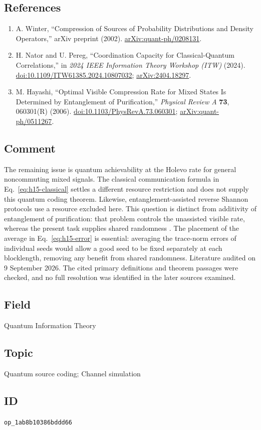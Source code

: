 \subsection*{References}

\begin{enumerate}[label={},leftmargin=4.8em,labelsep=0.5em]
  \footnotesize
  \item[\textup{[Win02]}]\label{ref:h15-winter}
  A. Winter, ``Compression of Sources of Probability Distributions and Density Operators,'' arXiv preprint (2002). \href{https://arxiv.org/abs/quant-ph/0208131}{arXiv:quant-ph/0208131}.

  \item[\textup{[NP24]}]\label{ref:h15-nator}
  H. Nator and U. Pereg, ``Coordination Capacity for Classical-Quantum Correlations,'' in \emph{2024 IEEE Information Theory Workshop (ITW)} (2024). \href{https://doi.org/10.1109/ITW61385.2024.10807032}{doi:10.1109/ITW61385.2024.10807032}; \href{https://arxiv.org/abs/2404.18297}{arXiv:2404.18297}.

  \item[\textup{[Hay06]}]\label{ref:h15-hayashi}
  M. Hayashi, ``Optimal Visible Compression Rate for Mixed States Is Determined by Entanglement of Purification,'' \emph{Physical Review A} \textbf{73}, 060301(R) (2006). \href{https://doi.org/10.1103/PhysRevA.73.060301}{doi:10.1103/PhysRevA.73.060301}; \href{https://arxiv.org/abs/quant-ph/0511267}{arXiv:quant-ph/0511267}.
\end{enumerate}

\subsection*{Comment}

The remaining issue is quantum achievability at the Holevo rate for general noncommuting mixed signals. The classical communication formula in Eq.~\eqref{eq:h15-classical} settles a different resource restriction and does not supply this quantum coding theorem. Likewise, entanglement-assisted reverse Shannon protocols use a resource excluded here. This question is distinct from additivity of entanglement of purification: that problem controls the unassisted visible rate, whereas the present task supplies shared randomness . The placement of the average in Eq.~\eqref{eq:h15-error} is essential: averaging the trace-norm errors of individual seeds would allow a good seed to be fixed separately at each blocklength, removing any benefit from shared randomness. Literature audited on 9 September 2026. The cited primary definitions and theorem passages were checked, and no full resolution was identified in the later sources examined.

\subsection*{Field}

Quantum Information Theory

\subsection*{Topic}

Quantum source coding; Channel simulation

\subsection*{ID}

\texttt{op\_1ab8b10386bddd66}
